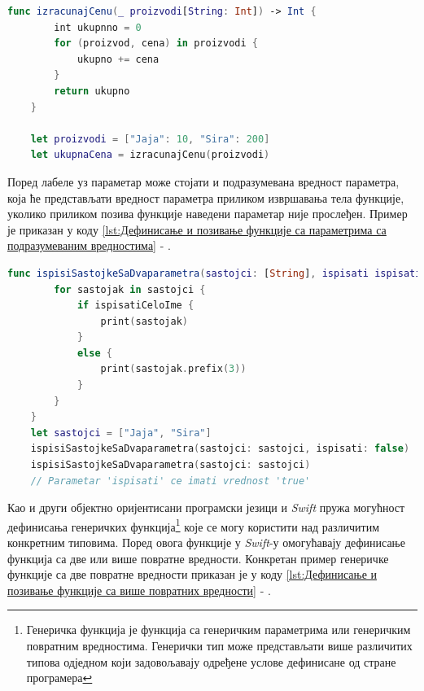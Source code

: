\documentclass[12pt,oneside]{memoir}
\begin{document}
\begin{lstlisting}[caption=\textit{{Дефинисање и позивање функције са повратном вредношћу}}, label={lst:Дефинисање и позивање функције са повратном вредношћу}, language=Swift, frame=single]
    func izracunajCenu(_ proizvodi[String: Int]) -> Int {
        int ukupnno = 0
        for (proizvod, cena) in proizvodi {
            ukupno += cena
        }
        return ukupno
    }
    
    let proizvodi = ["Jaja": 10, "Sira": 200]
    let ukupnaCena = izracunajCenu(proizvodi)
\end{lstlisting}
    
\indent Поред лабеле уз параметар може стојати и подразумевана вредност параметра, која ће представљати вредност параметра приликом извршавања тела функције, уколико приликом позива функције наведени параметар није прослеђен. Пример је приказан у коду \ref{lst:Дефинисање и позивање функције са параметрима са подразумеваним вредностима} - .
    
\begin{lstlisting}[caption=\textit{{Дефинисање и позивање функције са параметрима са подразумеваним вредностима}}, label={lst:Дефинисање и позивање функције са параметрима са подразумеваним вредностима}, language=Swift, frame=single]
    func ispisiSastojkeSaDvaparametra(sastojci: [String], ispisati ispisatiCeloIme: Bool = true) {
        for sastojak in sastojci {
            if ispisatiCeloIme {
                print(sastojak)
            }
            else {
                print(sastojak.prefix(3))
            }
        }
    }
    let sastojci = ["Jaja", "Sira"]
    ispisiSastojkeSaDvaparametra(sastojci: sastojci, ispisati: false)
    ispisiSastojkeSaDvaparametra(sastojci: sastojci)
    // Parametar 'ispisati' ce imati vrednost 'true'
\end{lstlisting}

\indent Као и други објектно оријентисани програмски језици и \textit{Swift} пружа могућност дефинисања генеричких функција\footnote{Генеричка функција је функција са генеричким параметрима или генеричким повратним вредностима. Генерички тип може представљати више различитих типова одједном који задовољавају одређене услове дефинисане од стране програмера} које се могу користити над различитим конкретним типовима. Поред овога функције у \textit{Swift}-у омогућавају дефинисање функција са две или више повратне вредности. Конкретан пример генеричке функције са две повратне вредности приказан је у коду \ref{lst:Дефинисање и позивање функције са више повратних вредности} - . 
\end{document}
